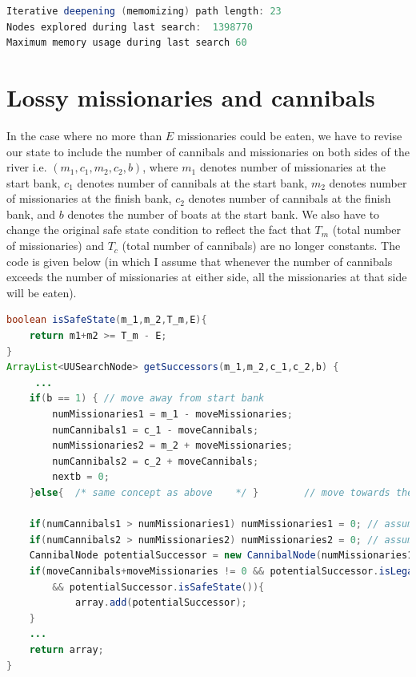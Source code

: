 \documentclass[9.5pt]{extarticle}
\begin{document}
\begin{lstlisting}[language=java,caption={Iterative deepening search using memomizing DFS for start state of (8,5,1)}]
Iterative deepening (memomizing) path length: 23 
Nodes explored during last search:  1398770
Maximum memory usage during last search 60
\end{lstlisting}

\section{Lossy missionaries and cannibals}

In the case where no more than $E$ missionaries could be eaten, we have to revise our state to include the number of cannibals and missionaries on both sides of the river i.e. $(m_1,c_1,m_2,c_2,b)$, where $m_1$ denotes number of missionaries at the start bank, $c_1$ denotes number of cannibals at the start bank, $m_2$ denotes number of missionaries at the finish bank, $c_2$ denotes number of cannibals at the finish bank, and $b$ denotes the number of boats at the start bank. We also have to change the original safe state condition to reflect the fact that $T_m$ (total number of missionaries) and $T_c$ (total number of cannibals) are no longer constants. The code is given below (in which I assume that whenever the number of cannibals exceeds the number of missionaries at either side, all the missionaries at that side will be eaten).

\begin{lstlisting}[language=java,caption={modified isSafeState and getSuccessors}]
boolean isSafeState(m_1,m_2,T_m,E){
	return m1+m2 >= T_m - E;
}
ArrayList<UUSearchNode> getSuccessors(m_1,m_2,c_1,c_2,b) {
	 ...
	if(b == 1) { // move away from start bank
		numMissionaries1 = m_1 - moveMissionaries;
		numCannibals1 = c_1 - moveCannibals;
		numMissionaries2 = m_2 + moveMissionaries;
		numCannibals2 = c_2 + moveCannibals;
		nextb = 0;
	}else{ 	/* same concept as above	*/ }		// move towards the finish bank
		
	if(numCannibals1 > numMissionaries1) numMissionaries1 = 0; // assumption
	if(numCannibals2 > numMissionaries2) numMissionaries2 = 0; // assumption
	CannibalNode potentialSuccessor = new CannibalNode(numMissionaries1,numCannibals1,numMissionaries2,numCannibals2,nextb,depth);
	if(moveCannibals+moveMissionaries != 0 && potentialSuccessor.isLegalState()
		&& potentialSuccessor.isSafeState()){
			array.add(potentialSuccessor);
	}
	...
	return array;
}
\end{lstlisting}
\end{document}
